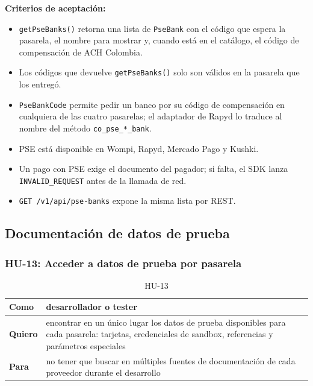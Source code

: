 \textbf{Criterios de aceptación:}
\begin{itemize}
  \item \texttt{getPseBanks()} retorna una lista de \texttt{PseBank} con el código que espera la pasarela, el nombre para mostrar y, cuando está en el catálogo, el código de compensación de ACH Colombia.
  \item Los códigos que devuelve \texttt{getPseBanks()} solo son válidos en la pasarela que los entregó.
  \item \texttt{PseBankCode} permite pedir un banco por su código de compensación en cualquiera de las cuatro pasarelas; el adaptador de Rapyd lo traduce al nombre del método \texttt{co\_pse\_*\_bank}.
  \item PSE está disponible en Wompi, Rapyd, Mercado Pago y Kushki.
  \item Un pago con PSE exige el documento del pagador; si falta, el SDK lanza \texttt{INVALID\_REQUEST} antes de la llamada de red.
  \item \texttt{GET /v1/api/pse-banks} expone la misma lista por REST.
\end{itemize}

\subsection{Documentación de datos de prueba}

\subsubsection{HU-13: Acceder a datos de prueba por pasarela}
\begin{table}[H]
  \centering
  \renewcommand{\arraystretch}{1.2}
  \begin{tabularx}{\textwidth}{|l|X|}
    \hline
    \textbf{Como} & desarrollador o tester \\
    \hline
    \textbf{Quiero} & encontrar en un único lugar los datos de prueba disponibles para cada pasarela: tarjetas, credenciales de sandbox, referencias y parámetros especiales \\
    \hline
    \textbf{Para} & no tener que buscar en múltiples fuentes de documentación de cada proveedor durante el desarrollo \\
    \hline
  \end{tabularx}
  \caption{HU-13}
  \label{tab:hu-13}
\end{table}

